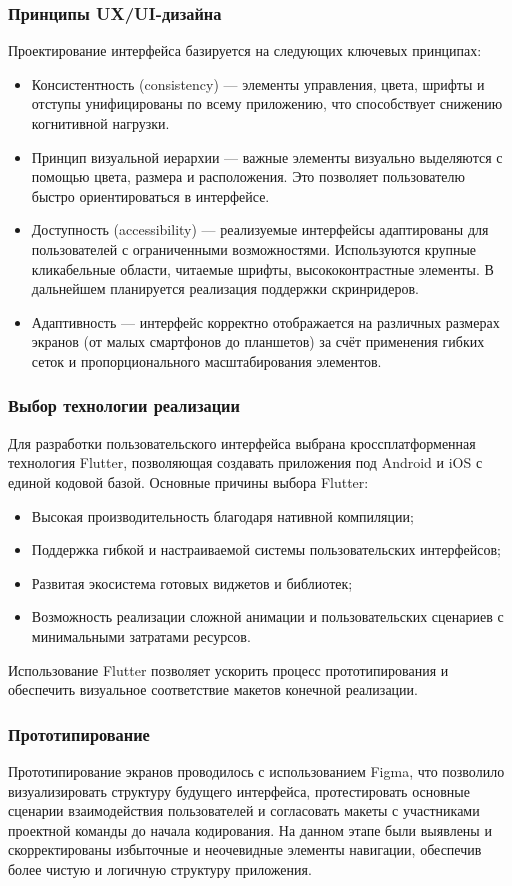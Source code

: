 \subsubsection*{Принципы UX/UI-дизайна}
Проектирование интерфейса базируется на следующих ключевых принципах:
\begin{itemize}
    \item Консистентность (consistency) — элементы управления, цвета, шрифты и отступы унифицированы по всему приложению, что способствует снижению когнитивной нагрузки.
    \item Принцип визуальной иерархии — важные элементы визуально выделяются с помощью цвета, размера и расположения. Это позволяет пользователю быстро ориентироваться в интерфейсе.
    \item Доступность (accessibility) — реализуемые интерфейсы адаптированы для пользователей с ограниченными возможностями. Используются крупные кликабельные области, читаемые шрифты, высококонтрастные элементы. В дальнейшем планируется реализация поддержки скринридеров.
    \item Адаптивность — интерфейс корректно отображается на различных размерах экранов (от малых смартфонов до планшетов) за счёт применения гибких сеток и пропорционального масштабирования элементов.
\end{itemize}

\subsubsection*{Выбор технологии реализации}
Для разработки пользовательского интерфейса выбрана кроссплатформенная технология Flutter, позволяющая создавать приложения под Android и iOS с единой кодовой базой. Основные причины выбора Flutter:
\begin{itemize}
    \item Высокая производительность благодаря нативной компиляции;
    \item Поддержка гибкой и настраиваемой системы пользовательских интерфейсов;
    \item Развитая экосистема готовых виджетов и библиотек;
    \item Возможность реализации сложной анимации и пользовательских сценариев с минимальными затратами ресурсов.
\end{itemize}
Использование Flutter позволяет ускорить процесс прототипирования и обеспечить визуальное соответствие макетов конечной реализации.

\subsubsection*{Прототипирование}
Прототипирование экранов проводилось с использованием Figma, что позволило визуализировать структуру будущего интерфейса, протестировать основные сценарии взаимодействия пользователей и согласовать макеты с участниками проектной команды до начала кодирования. На данном этапе были выявлены и скорректированы избыточные и неочевидные элементы навигации, обеспечив более чистую и логичную структуру приложения.

